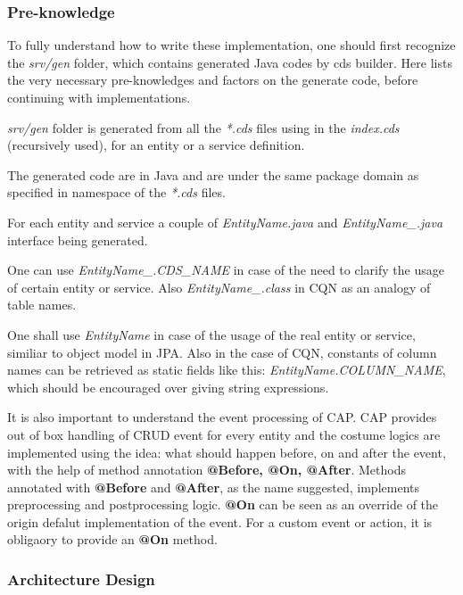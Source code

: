 \subsubsection{Pre-knowledge}
To fully understand how to write these implementation, one should first recognize the \textit{srv/gen} folder, which contains generated Java codes by cds builder. Here lists the very necessary pre-knowledges and factors on the generate code, before continuing with implementations. 
\begin{compactenum}
	\item \textit{srv/gen} folder is generated from all the \textit{*.cds} files using in the \textit{index.cds} (recursively used), for an entity or a service definition.
    \item The generated code are in Java and are under the same package domain as specified in namespace of the \textit{*.cds} files.
    \item For each entity and service a couple of \textit{EntityName.java} and \textit{EntityName\_.java} interface being generated. 
    \item One can use \textit{EntityName\_.CDS\_NAME} in case of the need to clarify the usage of certain entity or service. Also \textit{EntityName\_.class} in CQN as an analogy of table names. 
    \item One shall use \textit{EntityName} in case of the usage of the real entity or service, similiar to object model in JPA. Also in the case of CQN, constants of column names can be retrieved as static fields like this: \textit{EntityName.COLUMN\_NAME}, which should be encouraged over giving string expressions.
\end{compactenum}

\bigskip
It is also important to understand the event processing of CAP. CAP provides out of box handling of CRUD event for every entity and the costume logics are implemented using the idea: what should happen before, on and after the event, with the help of method annotation \textbf{@Before, @On, @After}. Methods annotated with \textbf{@Before} and \textbf{@After}, as the name suggested, implements preprocessing and postprocessing logic. \textbf{@On} can be seen as an override of the origin defalut implementation of the event. For a custom event or action, it is obligaory to provide an \textbf{@On} method.

\subsubsection{Architecture Design}

